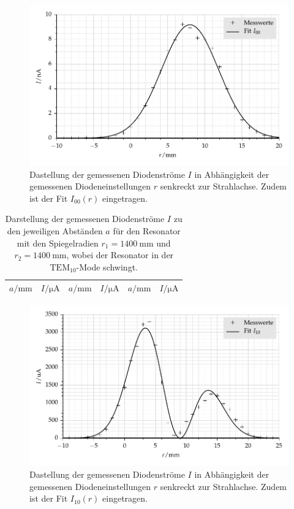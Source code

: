 \begin{figure}[h!]
	\centering
	\includegraphics{bilder/fig_M2.pdf}
	\caption{Dastellung der gemessenen Diodenströme $I$ in Abhängigkeit der
	gemessenen Diodeneinstellungen $r$ senkreckt zur Strahlachse.
	Zudem ist der Fit $I_{00}(r)$ eingetragen.}
	\label{fig:M2}
\end{figure}

\clearpage
\begin{table}[hb]
	\centering
	\begin{tabular}{cc|cc|cc}
		\midrule
		\midrule
		$a/\si{\mm}$ & $I/\si{\uA}$ & $a/\si{\mm}$ & $I/\si{\uA}$ &
		$a/\si{\mm}$ & $I/\si{\uA}$ \\
		\midrule
		
		\midrule
		\midrule
	\end{tabular}
	\caption{Darstellung der gemessenen Diodenströme $I$ zu den jeweiligen
		Abständen $a$ für den Resonator mit den Spiegelradien
		$r_1 = \SI{1400}{\milli\meter}$ und $r_2 = \SI{1400}{\milli\meter}$,
		wobei der Resonator in der $\text{TEM}_{10}$-Mode schwingt.}
	\label{tab:M1}
\end{table}

\begin{figure}[h!]
	\centering
	\includegraphics{bilder/fig_M1.pdf}
	\caption{Dastellung der gemessenen Diodenströme $I$ in Abhängigkeit der
	gemessenen Diodeneinstellungen $r$ senkreckt zur Strahlachse.
	Zudem ist der Fit $I_{10}(r)$ eingetragen.}
	\label{fig:M1}
\end{figure}


